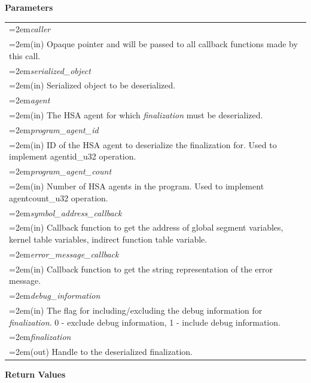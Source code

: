 \documentclass[final,oneside]{book}
\newcommand{\refarg}[1]{\textit{#1}}
\begin{document}
\noindent\textbf{Parameters}\\[-6mm]
\noindent\begin{longtable}{@{}>{\hangindent=2em}p{\textwidth}}
\refarg{caller}\\\hspace{2em}(in) Opaque pointer and will be passed to all callback functions made by this call.\\[2mm]
\refarg{serialized_\-object}\\\hspace{2em}(in) Serialized object to be deserialized.\\[2mm]
\refarg{agent}\\\hspace{2em}(in) The HSA agent for which \textit{finalization} must be deserialized.\\[2mm]
\refarg{program_\-agent_\-id}\\\hspace{2em}(in) ID of the HSA agent to deserialize the finalization for. Used to implement agentid_\-u32 operation.\\[2mm]
\refarg{program_\-agent_\-count}\\\hspace{2em}(in) Number of HSA agents in the program. Used to implement agentcount_\-u32 operation.\\[2mm]
\refarg{symbol_\-address_\-callback}\\\hspace{2em}(in) Callback function to get the address of global segment variables, kernel table variables, indirect function table variable.\\[2mm]
\refarg{error_\-message_\-callback}\\\hspace{2em}(in) Callback function to get the string representation of the error message.\\[2mm]
\refarg{debug_\-information}\\\hspace{2em}(in) The flag for including/excluding the debug information for \textit{finalization}. 0 - exclude debug information, 1 - include debug information.\\[2mm]
\refarg{finalization}\\\hspace{2em}(out) Handle to the deserialized finalization.
\end{longtable}
\vspace{-5mm}\noindent\textbf{Return Values}\\[-6mm]
\end{document}

